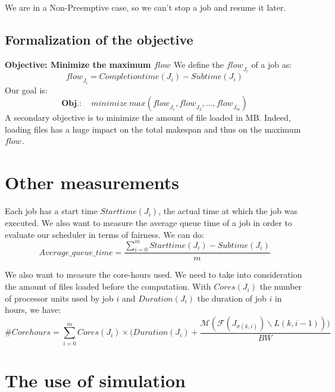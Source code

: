 \documentclass[a4paper]{article}
\newtheorem{definition}{Definition}
\newcommand{\flow}[1]{\ensuremath{\mathit{flow}_{#1}}\xspace}
\newcommand{\inputs}{\ensuremath{\mathcal{F}}\xspace}
\newcommand{\memory}{\ensuremath{\mathcal{M}}\xspace}
\newcommand{\duration}{\mathit{Duration}\xspace}
\newcommand{\bandwidth}{\mathit{BW}\xspace}
\newcommand{\core}{\mathit{Cores}\xspace}
\newcommand{\submissiontime}{\mathit{Subtime}\xspace}
\newcommand{\completiontime}{\mathit{Completiontime}\xspace}
\newcommand{\start}{\mathit{Starttime}\xspace}
\newcommand{\evict}{\ensuremath{\mathcal{V}}\xspace}
\newcommand{\nbloads}{\ensuremath{\mathit{\mathit{Loads}}}\xspace}
\newcommand{\live}{\ensuremath{L}\xspace}
\begin{document}


We are in a Non-Preemptive case, so we can't stop a job and resume it later.

\subsection{Formalization of the objective}
\textbf{Objective: Minimize the maximum \flow{}}
		We define the \flow{J_i} of a job as:
		$$
			\flow{J_i} = \completiontime(J_i) - \submissiontime(J_i)
		$$
		Our goal is:
		$$
			\textbf{Obj.}: \quad \mathit{minimize}~\mathit{max}(\flow{J_1}, \flow{J_2}, ..., \flow{J_m})
		$$
A secondary objective is to minimize the amount of file loaded in MB.
Indeed, loading files has a huge impact on the total makespan and thus on the maximum \flow{}.

\section{Other measurements}

Each job has a start time $\start(J_i)$, the actual time at which the job was executed.
We also want to measure the average queue time of a job in order
to evaluate our scheduler in terms of fairness. We can do:
$$
	Average\_queue\_time = \frac{\sum^{m}_{i = 0} \start(J_i) - \submissiontime(J_i)}{m}
$$

We also want to measure the core-hours used. We need to take into consideration the amount of files loaded before the computation.
With $\core(J_i)$ the number of processor units used by job $i$ and $\duration(J_i)$ the duration of job $i$ in hours, we have:
$$
	\#Corehours = \sum^{m}_{i = 0} \core(J_i) \times (\duration(J_i) + \frac{\memory(\inputs\left(J_{\sigma(k,i)}\right) \backslash \live(k,i-1)))}{\bandwidth}
$$

\section{The use of simulation}
\end{document}
